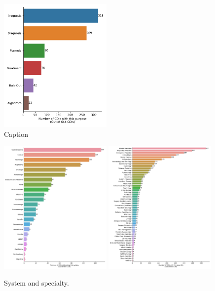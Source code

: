 \documentclass[10pt]{article}
\begin{document}
\begin{figure}[H]
    \centering
    \includegraphics[width=0.49\textwidth]{../results/purpose_en.pdf}
    \caption{Caption}
\end{figure}

\begin{figure}[H]
    \centering
    \includegraphics[width=0.49\textwidth]{../results/system_en.pdf}
    \includegraphics[width=0.49\textwidth]{../results/specialty_en.pdf}
    \caption{System and specialty.}
\end{figure}
\end{document}
